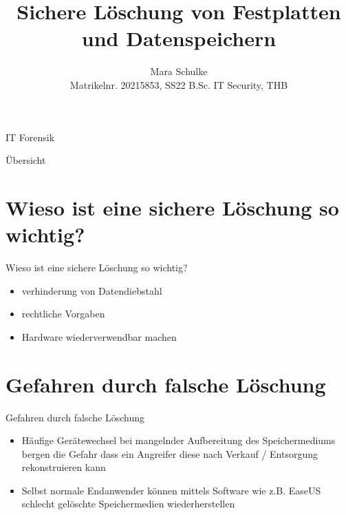 \documentclass{beamer}
\title{Sichere Löschung von Festplatten und Datenspeichern}
\author{Mara Schulke\\\tiny{Matrikelnr. 20215853, SS22 B.Sc. IT Security, THB}}
\begin{document}
\begin{frame}
	IT Forensik
	\vspace{1em}
	\titlepage
\end{frame}

\begin{frame}{Übersicht}
	\tableofcontents
\end{frame}

\section{Wieso ist eine sichere Löschung so wichtig?}
\begin{frame}{Wieso ist eine sichere Löschung so wichtig?}
	\begin{itemize}
		\item verhinderung von Datendiebstahl
		\item rechtliche Vorgaben
		\item Hardware wiederverwendbar machen
	\end{itemize}
\end{frame}

\section{Gefahren durch falsche Löschung}
\begin{frame}{Gefahren durch falsche Löschung}
	\begin{itemize}
		\item Häufige Gerätewechsel bei mangelnder Aufbereitung des Speichermediums
			bergen die Gefahr dass ein Angreifer diese nach Verkauf / Entsorgung
			rekonstruieren kann
		\item Selbst normale Endanwender können mittels Software wie z.B.
			EaseUS schlecht gelöschte Speichermedien wiederherstellen 
	\end{itemize}
\end{frame}
\end{document}
